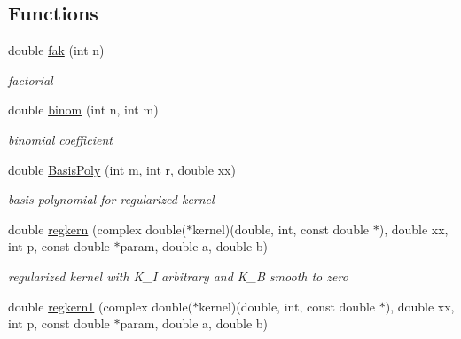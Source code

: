 \subsection*{Functions}
\begin{CompactItemize}
\item 
\hypertarget{group__applications__fastsum_ga1}{
double \hyperlink{group__applications__fastsum_ga1}{fak} (int n)}
\label{group__applications__fastsum_ga1}

\begin{CompactList}\small\item\em factorial \item\end{CompactList}\item 
\hypertarget{group__applications__fastsum_ga2}{
double \hyperlink{group__applications__fastsum_ga2}{binom} (int n, int m)}
\label{group__applications__fastsum_ga2}

\begin{CompactList}\small\item\em binomial coefficient \item\end{CompactList}\item 
\hypertarget{group__applications__fastsum_ga3}{
double \hyperlink{group__applications__fastsum_ga3}{Basis\-Poly} (int m, int r, double xx)}
\label{group__applications__fastsum_ga3}

\begin{CompactList}\small\item\em basis polynomial for regularized kernel \item\end{CompactList}\item 
\hypertarget{group__applications__fastsum_ga4}{
double \hyperlink{group__applications__fastsum_ga4}{regkern} (complex double($\ast$kernel)(double, int, const double $\ast$), double xx, int p, const double $\ast$param, double a, double b)}
\label{group__applications__fastsum_ga4}

\begin{CompactList}\small\item\em regularized kernel with K\_\-I arbitrary and K\_\-B smooth to zero \item\end{CompactList}\item 
\hypertarget{group__applications__fastsum_ga5}{
double \hyperlink{group__applications__fastsum_ga5}{regkern1} (complex double($\ast$kernel)(double, int, const double $\ast$), double xx, int p, const double $\ast$param, double a, double b)}
\label{group__applications__fastsum_ga5}


\end{CompactItemize}
